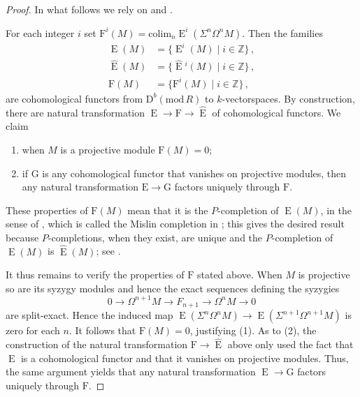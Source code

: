 \documentclass{amsart}
\numberwithin{equation}{section}
\theoremstyle{plain}
\theoremstyle{definition}
\theoremstyle{remark}
\newcommand{\dbcat}[1]{\mathrm{D}^b(\mathrm{mod}\,{#1})}
\newcommand{\bbZ}{\mathbb{Z}}
\newcommand{\eee}{\operatorname{E}}
\begin{document}
\begin{proof}
In what follows we rely on \cite[Section 2]{Mislin:1994a} and \cite[Section 4]{Kropholler:1994a}.

For each integer $i$ set $\mathrm{F}^i(M)= \mathrm{colim}_n \eee^i(\Sigma^n\Omega^n M)$. Then the families 
\begin{align*}
\eee(M)&=\{\eee^i(M)\mid i\in\bbZ\}\,, \\
\widehat{\eee}(M)&=\{\widehat{\eee}{}^i(M)\mid i\in\bbZ\}\,, \\
\mathrm{F}(M)&=\{\mathrm{F}^i(M)\mid i\in\bbZ\}\,, 
\end{align*}
are cohomological functors from $\dbcat R$ to $k$-vectorspaces. By construction, there are natural transformation $\eee \to \mathrm{F}\to \widehat{\eee}$  of cohomological functors. We claim
\begin{enumerate}[\quad\rm(1)]
    \item when $M$ is a projective module $\mathrm{F}(M)=0$;
    \item if $\mathrm{G}$ is any cohomological functor that vanishes on projective modules, then any natural transformation $\mathrm{E}\to \mathrm{G}$ factors uniquely through $\mathrm{F}$.
\end{enumerate}
These properties of  $\mathrm{F}(M)$ mean that it is the $P$-completion of $\eee(M)$, in the sense of \cite[Section 2]{Mislin:1994a}, which is called the Mislin completion in \cite[Section 4]{Kropholler:1994a}; this gives the desired result because $P$-completions, when they exist, are unique and the $P$-completion of $\eee(M)$ is $\widehat{\eee}(M)$; see \cite[Section 4]{Kropholler:1994a}.

It thus remains to verify the properties of $\mathrm{F}$ stated above. When $M$ is projective so are its syzygy modules and hence the exact sequences defining the syzygies
\[
0\longrightarrow \Omega^{n+1}M\longrightarrow F_{n+1}\longrightarrow \Omega^{n}M\longrightarrow 0
\]
 are split-exact. Hence the induced map $\eee(\Sigma^{n}\Omega^{n}M)\to \eee(\Sigma^{n+1}\Omega^{n+1}M)$ is zero for each $n$.  It follows that $\mathrm{F}(M)=0$, justifying (1).  As to (2), the  construction of the natural transformation $\mathrm{F}\to \widehat{\eee}$ above only used the fact that $\mathrm{\eee}$ is a cohomological functor and that it vanishes on projective modules. Thus, the same argument yields that any natural transformation $\eee\to \mathrm{G}$ factors uniquely through $\mathrm{F}$.
\end{proof}
\end{document}
